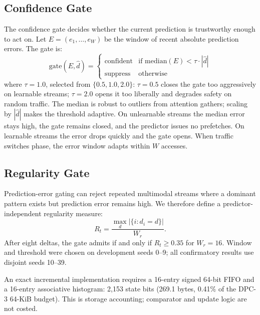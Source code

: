 \documentclass[sigplan,anonymous,review,nonacm]{acmart}
\begin{document}
\subsection{Confidence Gate}
\label{sec:confidence_gate}

The confidence gate decides whether the current prediction is trustworthy
enough to act on. Let $E = (e_1, \ldots, e_W)$ be the window of recent
absolute prediction errors. The gate is:
\begin{equation}
\text{gate}(E, \hat{d}) = \begin{cases}
\text{confident} & \text{if } \text{median}(E) < \tau \cdot |\hat{d}| \\
\text{suppress}  & \text{otherwise}
\end{cases}
\label{eq:gate}
\end{equation}
where $\tau = 1.0$, selected from $\{0.5, 1.0, 2.0\}$: $\tau = 0.5$ closes
the gate too aggressively on learnable streams; $\tau = 2.0$ opens it too
liberally and degrades safety on random traffic. The median is robust to
outliers from attention gathers; scaling by $|\hat{d}|$ makes the threshold
adaptive. On unlearnable streams the median error stays high, the gate
remains closed, and the predictor issues no prefetches. On learnable streams
the error drops quickly and the gate opens. When traffic switches phase, the
error window adapts within $W$ accesses.

\subsection{Regularity Gate}
\label{sec:regularity_gate}

Prediction-error gating can reject repeated multimodal streams where a
dominant pattern exists but prediction error remains high. We therefore
define a predictor-independent regularity measure:
\begin{equation}
R_t = \frac{\max_d |\{i : d_i = d\}|}{W_r}.
\label{eq:regularity}
\end{equation}
After eight deltas, the gate admits if and only if $R_t \geq 0.35$ for
$W_r = 16$. Window and threshold were chosen on development seeds 0--9; all
confirmatory results use disjoint seeds 10--39.

An exact incremental implementation requires a 16-entry signed 64-bit FIFO
and a 16-entry associative histogram: 2,153 state bits (269.1 bytes, 0.41\%
of the DPC-3 64-KiB budget). This is storage accounting; comparator and
update logic are not costed.
\end{document}
